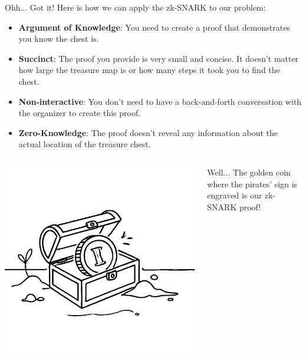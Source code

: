 \documentclass{beamer}
\begin{document}
    \begin{frame}{Ohh... Got it!}
        Here is how we can apply the zk-SNARK to our problem:

        \begin{itemize} 
            \item \textbf{Argument of Knowledge}: You need to create a proof that demonstrates you know the
            chest is. \pause
            \item \textbf{Succinct}: The proof you provide is very small and concise. It doesn't matter how
            large the treasure map is or how many steps it took you to find the chest. \pause
            \item \textbf{Non-interactive}: You don't need to have a back-and-forth conversation with the 
            organizer to create this proof. \pause
            \item \textbf{Zero-Knowledge}: The proof doesn't reveal any information about the actual 
            location of the treasure chest.
        \end{itemize}

        \pause

        \begin{columns}
            \begin{column}{0.3\textwidth}
                \includegraphics[width=\textwidth]{../presentations/images/lecture_8/treasure.jpg}
            \end{column}

            \begin{column}{0.65\textwidth}
                Well... The golden coin where the pirates' sign is engraved is our zk-SNARK proof!
            \end{column}
        \end{columns}
    \end{frame}
\end{document}

